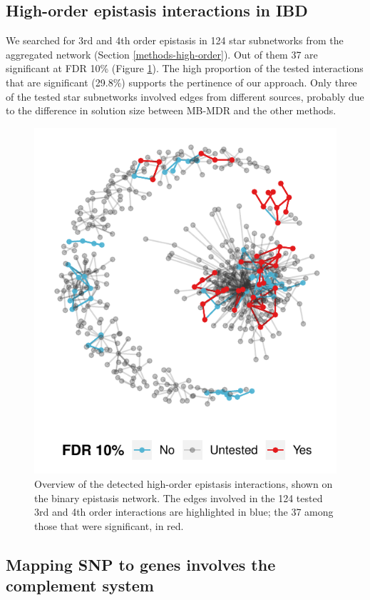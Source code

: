 \documentclass[
  11pt,
]{env/yjiao}
\begin{document}
\hypertarget{high-order-epistasis-interactions-in-ibd}{%
\subsection{High-order epistasis interactions in IBD}\label{high-order-epistasis-interactions-in-ibd}}

We searched for 3rd and 4th order epistasis in 124 star subnetworks from the aggregated network (Section \ref{methods-high-order}). Out of them 37 are significant at FDR 10\% (Figure \ref{fig:high-order}). The high proportion of the tested interactions that are significant (29.8\%) supports the pertinence of our approach. Only three of the tested star subnetworks involved edges from different sources, probably due to the difference in solution size between MB-MDR and the other methods.



\begin{figure}

{\centering \includegraphics[width=0.6\linewidth]{fig/high_order_significant} 

}

\caption{Overview of the detected high-order epistasis interactions, shown on the binary epistasis network. The edges involved in the 124 tested 3rd and 4th order interactions are highlighted in blue; the 37 among those that were significant, in red.}\label{fig:high-order}
\end{figure}

\hypertarget{mapping-snp-to-genes-involves-the-complement-system}{%
\subsection{Mapping SNP to genes involves the complement system}\label{mapping-snp-to-genes-involves-the-complement-system}}
\end{document}
